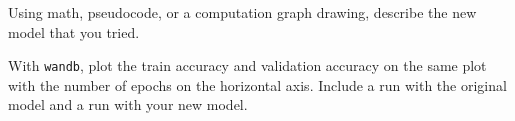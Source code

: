 \documentclass[11pt,addpoints,answers]{exam}
\begin{document}
\begin{questions}
\begin{parts}
\begin{subparts}

    \subpart[3] Using math, pseudocode, or a computation graph drawing, describe the new model that you tried.

        \begin{answer_box}[title=,height=7cm, width=15cm]
        \end{answer_box}
        
\newpage
    \subpart[4] With \lstinline{wandb}, plot the train accuracy and validation accuracy on the same plot with the number of epochs on the horizontal axis. Include a run with the original model and a run with your new model.
        
        \begin{answer_box}[title=,height=8cm, width=15cm]
        \end{answer_box}

\end{subparts}

\end{parts}

\clearpage


\end{questions}
\end{document}

